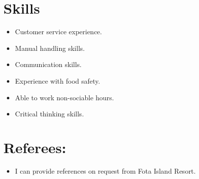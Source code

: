 \documentclass{article}
\begin{document}
\section{Skills}
\begin{itemize}
\item Customer service experience.
\item Manual handling skills.
\item Communication skills.
\item Experience with food safety.
\item Able to work non-sociable hours.
\item Critical thinking skills.
\end{itemize}
\section{Referees:}
\begin{itemize}
\item I can provide references on request from Fota Island Resort.
\end{itemize}
\end{document}
